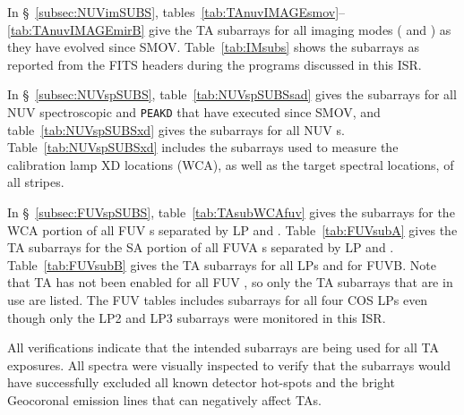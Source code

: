 In \S~\ref{subsec:NUVimSUBS}, tables~\ref{tab:TAnuvIMAGEsmov}--\ref{tab:TAnuvIMAGEmirB} give the TA subarrays for all imaging modes
( and ) as they have evolved since SMOV.
Table~\ref{tab:IMsubs} shows the  subarrays as reported from the FITS headers during the programs discussed in this ISR.

In \S~\ref{subsec:NUVspSUBS}, table~\ref{tab:NUVspSUBSsad} gives the subarrays for all NUV spectroscopic  and \texttt{PEAKD} that have executed since SMOV,
and table~\ref{tab:NUVspSUBSxd} gives the subarrays for all NUV s. Table~\ref{tab:NUVspSUBSxd} includes the subarrays used to measure the
calibration lamp XD locations (WCA), as well as the target spectral locations, of all stripes.

In \S~\ref{subsec:FUVspSUBS}, table~\ref{tab:TAsubWCAfuv} gives the subarrays for the WCA portion of all FUV s separated by LP and \cenwave{}.
Table~\ref{tab:FUVsubA} gives the TA subarrays for the SA portion of all FUVA \tacq{}s separated by LP and \cenwave{}.
Table~\ref{tab:FUVsubB} gives the TA subarrays for all LPs and \cenwaves{} for FUVB.
Note that TA has not been enabled for all FUV \cenwaves{}, so only the TA subarrays that are in use are listed.
The FUV tables includes subarrays for all four COS LPs even though only the LP2 and LP3 subarrays were monitored in this ISR.

All verifications indicate that the intended subarrays are being used for all TA exposures. All spectra were visually
inspected to verify that the subarrays would have successfully excluded all known detector hot-spots and the
bright Geocoronal emission lines that can negatively affect TAs.
\clearpage
